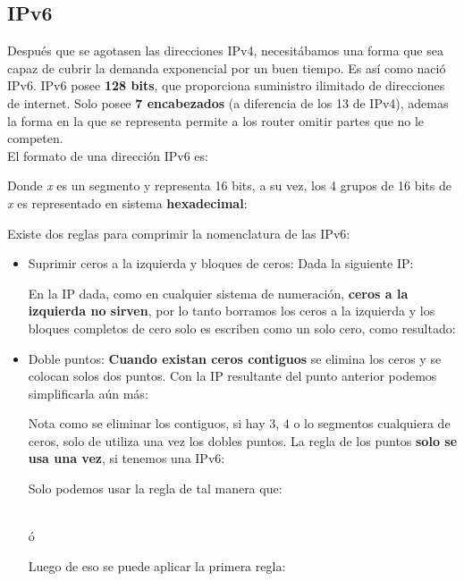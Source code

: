 \documentclass[
	12pt, %
	fleqn, %
	a4paper, %
	oneside, %
]{LegrandOrangeBook}
\begin{document}
\subsection{IPv6}
Después que se agotasen las direcciones IPv4, necesitábamos una forma que sea capaz de cubrir la demanda exponencial por un buen tiempo. Es así como nació IPv6. IPv6 posee \textbf{128 bits}, que proporciona suministro ilimitado de direcciones de internet. Solo posee \textbf{7 encabezados} (a diferencia de los 13 de IPv4), ademas la forma en la que se representa permite a los router omitir partes que no le competen.\\
El formato de una dirección IPv6 es:
\begin{center}
\end{center}
Donde \textit{x} es un segmento y representa 16 bits, a su vez, los 4 grupos de 16 bits de \textit{x} es representado en sistema \textbf{hexadecimal}:
\begin{center}
\end{center}
Existe dos reglas para comprimir la nomenclatura de las IPv6:
\begin{itemize}
\item Suprimir ceros a la izquierda y bloques de ceros: Dada la siguiente IP:
\begin{center}
\end{center}
En la IP dada, como en cualquier sistema de numeración, \textbf{ceros a la izquierda no sirven}, por lo tanto borramos los ceros a la izquierda y los bloques completos de cero solo es escriben como un solo cero, como resultado:
\begin{center}
\end{center}
\item Doble puntos: \textbf{Cuando existan ceros contiguos} se elimina los ceros y se colocan solos dos puntos. Con la IP resultante del punto anterior podemos simplificarla aún más:
\begin{center}
\end{center}
Nota como se eliminar los contiguos, si hay 3, 4 o lo segmentos cualquiera de ceros, solo de utiliza una vez los dobles puntos. La regla de los puntos \textbf{solo se usa una vez}, si tenemos una IPv6:
\begin{center}
\end{center}
Solo podemos usar la regla de tal manera que:
\begin{center}
\\
ó\\
\end{center}
Luego de eso se puede aplicar la primera regla:
\begin{center}
\end{center}
\end{itemize}
\end{document}
